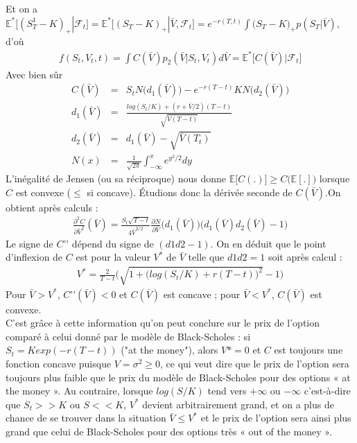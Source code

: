 \documentclass{report}
\begin{document}
Et on a $\mathbb{E}^*\big[(S^1_T-K)_+ | \mathcal{F}_t\big] = \mathbb{E}^*\big[(S_T-K)_+ | \bar{V}, \mathcal{F}_t\big] = e^{-r(T, t)}\int{\big(S_T-K\big)_+p(S_T |\bar{V})}$, d'où 
\begin{eqnarray*}
f(S_t, V_t, t) = \int{C(\bar{V})p_2(\bar{V} | S_t, V_t)d\bar{V}} = \mathbb{E}^*\big[C(\bar{V}) | \mathcal{F}_t\big]
\end{eqnarray*}
Avec bien sûr
\begin{eqnarray*}
C(\bar{V}) &=& S_t N\big(d_1(\bar{V})\big) - e^{-r(T-t)}KN\big(d_2(\bar{V})\big)\\
d_1(\bar{V}) &=& \frac{log(S_t/K) + (r + \bar{V}/2)(T-t)}{\sqrt{\bar{V}(T-t)}}\\
d_2(\bar{V}) &=& d_1(\bar{V}) - \sqrt{\bar{V}(T_t)}\\
N(x) &=& \frac{1}{\sqrt{2\pi}}\int_{-\infty}^x{e^{y^2/2}dy}
\end{eqnarray*}
\newline
L’inégalité de Jensen (ou sa réciproque) nous donne $\mathbb{E}\big[C(.)\big] \geq C\big(\mathbb{E}[.]\big)$ lorsque $C$ est convexe ($\leq$ si concave). Étudions donc la dérivée seconde de $C(\bar{V})$.On obtient après calculs :
\begin{eqnarray*}
\frac{\partial^2 C}{\partial \bar{V}^2}(\bar{V}) = \frac{S_t\sqrt{T-t}}{4\bar{V}^{3/2}}\frac{\partial N}{\partial \bar{V}} \big(d_1(\bar{V})\big)\big(d_1(\bar{V})d_2(\bar{V}) - 1\big)
\end{eqnarray*}
Le signe de $C’’$ dépend du signe de $(d1d2 - 1)$. On en déduit que le point d’inflexion de $C$ est pour la valeur $V^*$ de $\bar{V}$ telle que $d1d2 = 1$ soit après calcul :
\begin{eqnarray*}
V^* = \frac{2}{T-t}\Big(\sqrt{1 + \big(log(S_t/K) + r(T-t))^2} - 1\Big)
\end{eqnarray*}
Pour $\bar{V} > V^*$, $C’’(\bar{V}) < 0$ et $C(\bar{V})$ est concave ; pour $\bar{V} < V^*$, $C(\bar{V})$ est convexe.\\
C’est grâce à cette information qu’on peut conclure sur le prix de l’option comparé à celui donné par le modèle de Black-Scholes : si $S_t = Kexp(-r(T-t))$ ("at the money"), alors $V* = 0$ et $C$ est toujours une fonction concave puisque $V = \sigma^2 \geq 0$, ce qui veut dire que le prix de l’option sera toujours plus faible que le prix du modèle de Black-Scholes pour des options « at the money ». Au contraire, lorsque $log(S/K)$ tend vers $+\infty$ ou $-\infty$ c’est-à-dire que $S_t >> K$ ou $S << K$, $V^*$ devient arbitrairement grand, et on a plus de chance de se trouver dans la situation $\bar{V} \leq V^*$ et le prix de l’option sera ainsi plus grand que celui de Black-Scholes pour des options très « out of the money ».
\end{document}
